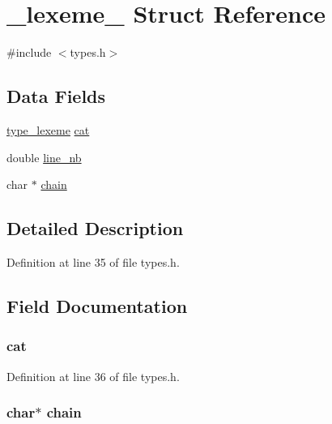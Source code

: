 \hypertarget{struct__lexeme__}{\section{\-\_\-lexeme\-\_\- Struct Reference}
\label{struct__lexeme__}
}


{\ttfamily \#include $<$types.\-h$>$}

\subsection*{Data Fields}
\begin{DoxyCompactItemize}
\item 
\hyperlink{types_8h_acf107ba6e52850b5e70b8ebd9d6be421}{type\-\_\-lexeme} \hyperlink{struct__lexeme___ac781c28e41fe8fd2e91d55c23764a26d}{cat}
\item 
double \hyperlink{struct__lexeme___a808a37180ef5a21555b2f0f68cf73cb6}{line\-\_\-nb}
\item 
char $\ast$ \hyperlink{struct__lexeme___a1a2e600921a838625caf6c28eb97240c}{chain}
\end{DoxyCompactItemize}


\subsection{Detailed Description}


Definition at line 35 of file types.\-h.



\subsection{Field Documentation}
\hypertarget{struct__lexeme___ac781c28e41fe8fd2e91d55c23764a26d}{
\subsubsection[{cat}]{ cat}}\label{struct__lexeme___ac781c28e41fe8fd2e91d55c23764a26d}


Definition at line 36 of file types.\-h.

\hypertarget{struct__lexeme___a1a2e600921a838625caf6c28eb97240c}{
\subsubsection[{chain}]{\setlength{\rightskip}{0pt plus 5cm}char$\ast$ chain}}\label{struct__lexeme___a1a2e600921a838625caf6c28eb97240c}


